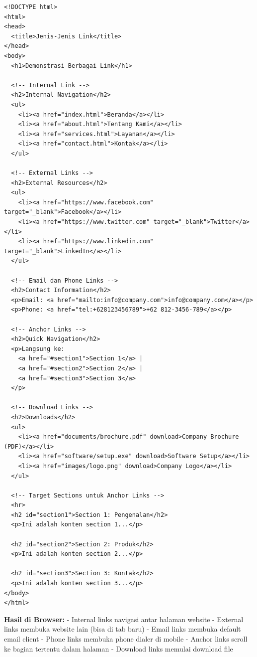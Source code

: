 \begin{lstlisting}[caption={Berbagai Jenis Link}, basicstyle=\ttfamily\small, frame=single]
<!DOCTYPE html>
<html>
<head>
  <title>Jenis-Jenis Link</title>
</head>
<body>
  <h1>Demonstrasi Berbagai Link</h1>
  
  <!-- Internal Link -->
  <h2>Internal Navigation</h2>
  <ul>
    <li><a href="index.html">Beranda</a></li>
    <li><a href="about.html">Tentang Kami</a></li>
    <li><a href="services.html">Layanan</a></li>
    <li><a href="contact.html">Kontak</a></li>
  </ul>
  
  <!-- External Links -->
  <h2>External Resources</h2>
  <ul>
    <li><a href="https://www.facebook.com" target="_blank">Facebook</a></li>
    <li><a href="https://www.twitter.com" target="_blank">Twitter</a></li>
    <li><a href="https://www.linkedin.com" target="_blank">LinkedIn</a></li>
  </ul>
  
  <!-- Email dan Phone Links -->
  <h2>Contact Information</h2>
  <p>Email: <a href="mailto:info@company.com">info@company.com</a></p>
  <p>Phone: <a href="tel:+628123456789">+62 812-3456-789</a></p>
  
  <!-- Anchor Links -->
  <h2>Quick Navigation</h2>
  <p>Langsung ke: 
    <a href="#section1">Section 1</a> | 
    <a href="#section2">Section 2</a> | 
    <a href="#section3">Section 3</a>
  </p>
  
  <!-- Download Links -->
  <h2>Downloads</h2>
  <ul>
    <li><a href="documents/brochure.pdf" download>Company Brochure (PDF)</a></li>
    <li><a href="software/setup.exe" download>Software Setup</a></li>
    <li><a href="images/logo.png" download>Company Logo</a></li>
  </ul>
  
  <!-- Target Sections untuk Anchor Links -->
  <hr>
  <h2 id="section1">Section 1: Pengenalan</h2>
  <p>Ini adalah konten section 1...</p>
  
  <h2 id="section2">Section 2: Produk</h2>
  <p>Ini adalah konten section 2...</p>
  
  <h2 id="section3">Section 3: Kontak</h2>
  <p>Ini adalah konten section 3...</p>
</body>
</html>
\end{lstlisting}

\textbf{Hasil di Browser:}
- Internal links navigasi antar halaman website
- External links membuka website lain (bisa di tab baru)
- Email links membuka default email client
- Phone links membuka phone dialer di mobile
- Anchor links scroll ke bagian tertentu dalam halaman
- Download links memulai download file


